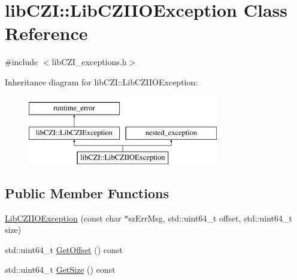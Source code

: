 \hypertarget{classlib_c_z_i_1_1_lib_c_z_i_i_o_exception}{}\section{lib\+C\+ZI\+:\+:Lib\+C\+Z\+I\+I\+O\+Exception Class Reference}
\label{classlib_c_z_i_1_1_lib_c_z_i_i_o_exception}


{\ttfamily \#include $<$lib\+C\+Z\+I\+\_\+exceptions.\+h$>$}

Inheritance diagram for lib\+C\+ZI\+:\+:Lib\+C\+Z\+I\+I\+O\+Exception\+:\begin{figure}[H]
\begin{center}
\leavevmode
\includegraphics[height=3.000000cm]{classlib_c_z_i_1_1_lib_c_z_i_i_o_exception}
\end{center}
\end{figure}
\subsection*{Public Member Functions}
\begin{DoxyCompactItemize}
\item 
\hyperlink{classlib_c_z_i_1_1_lib_c_z_i_i_o_exception_aa8912797c22c48afee6e24bdb1e03008}{Lib\+C\+Z\+I\+I\+O\+Exception} (const char $\ast$sz\+Err\+Msg, std\+::uint64\+\_\+t offset, std\+::uint64\+\_\+t size)
\item 
std\+::uint64\+\_\+t \hyperlink{classlib_c_z_i_1_1_lib_c_z_i_i_o_exception_a74781fd4547321f2e81e04028f385fd8}{Get\+Offset} () const
\item 
std\+::uint64\+\_\+t \hyperlink{classlib_c_z_i_1_1_lib_c_z_i_i_o_exception_affd1d9993181dbbed726234b01c1eca7}{Get\+Size} () const
\end{DoxyCompactItemize}


